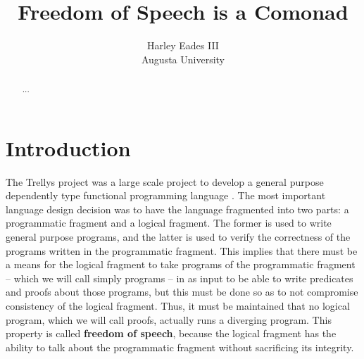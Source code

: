 \usepackage{amssymb,amsmath,amsthm}
\usepackage{stmaryrd}
\usepackage{todonotes}
\usepackage{mathpartir}
\usepackage{enumerate}
\usepackage{hyperref}

\usepackage[barr]{xy}
\let\mto\to
\let\to\rightarrow

\usepackage{color}
\usepackage{supertabular}




\newcommand{\cat}[1]{\mathcal{#1}}
\newcommand{\uar}[0]{\mathop{\uparrow}}
\newcommand{\dar}[0]{\mathop{\downarrow}}
\newcommand{\st}[1]{\mathsf{st}_{#1}}
\newcommand{\id}[0]{\mathsf{id}}

\title{Freedom of Speech is a Comonad}

\author{Harley Eades III\\
  Augusta University}



\maketitle

\begin{abstract}
  ... 
\end{abstract}

\section{Introduction}
\label{sec:introduction}

The Trellys project was a large scale project to develop a general
purpose dependently type functional programming language \cite{??}.
The most important language design decision was to have the language
fragmented into two parts: a programmatic fragment and a logical
fragment.  The former is used to write general purpose programs, and
the latter is used to verify the correctness of the programs written
in the programmatic fragment.  This implies that there must be a means
for the logical fragment to take programs of the programmatic fragment
-- which we will call simply programs -- in as input to be able to
write predicates and proofs about those programs, but this must be
done so as to not compromise consistency of the logical fragment.
Thus, it must be maintained that no logical program, which we will
call proofs, actually runs a diverging program. This property is
called \textbf{freedom of speech}, because the logical fragment has
the ability to talk about the programmatic fragment without
sacrificing its integrity.

